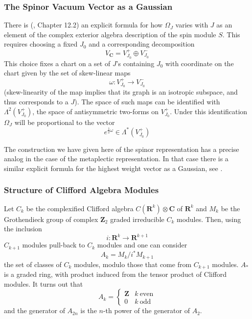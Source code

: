 \documentclass[a4paper,a4paper]{article}
\theoremstyle{conjecture}
\begin{document}
\subsubsection{The Spinor Vacuum Vector as a Gaussian}
\label{spinor-vacuum-vector}

There is (\cite{PS}, Chapter 12.2) an explicit formula for how $\Omega_J$ 
varies with $J$ as an element of the complex exterior algebra description of 
the spin module $S$. 
This requires choosing a fixed $J_0$ and a corresponding 
decomposition 
$$V_{\mathbf C}=V^+_{J_0}\oplus V^-_{J_0}$$
This choice fixes a chart on a set of $J$'s containing $J_0$ with coordinate
on the chart given by the set of skew-linear maps
$$\omega: V^+_{J_0}\rightarrow V^-_{J_0}$$
(skew-linearity of the map implies that its graph is an isotropic subspace,
and thus corresponds to a $J$). The space of such maps can be identified with
$\Lambda^2(V^+_{J_0})$, the space of antisymmetric two-forms on $V^+_{J_0}$. Under
this identification $\Omega_J$ will be proportional to the vector
$$e^{\frac{1}{2}\omega}\in \Lambda^*(V^+_{J_0})$$

The construction we have given here of the spinor representation has a precise
analog in the case of the metaplectic representation. In that case there is
a similar explicit formula for the highest weight vector as a Gaussian, see
\cite{Segal2}. 


\subsubsection{Structure of Clifford Algebra Modules}
\label{clifford-algebra-modules}


Let $C_k$ be the complexified Clifford algebra $C(\mathbf R^k)\otimes \mathbf C$ of
$\mathbf R^k$ and $M_k$ be the Grothendieck group of complex $\mathbf Z_2$ graded
irreducible $C_k$ modules. Then, using the inclusion
$$i:\mathbf R^k\rightarrow \mathbf R^{k+1}$$
$C_{k+1}$ modules pull-back to $C_k$ modules and one can consider
$$A_k=M_k/i^*M_{k+1}$$
the set of classes of $C_k$ modules, modulo those that come from $C_{k+1}$ modules.
$A_*$ is a graded ring, with product induced from the tensor product of Clifford
modules. It turns out \cite{ABS} that
\begin{equation*}
A_k=
\begin{cases}   
{\mathbf Z}&k\ \text{even}\\
0&k\ \text{odd}
\end{cases}
\end{equation*}
and the generator of $A_{2n}$ is the $n$-th power of the generator of $A_2$.
\end{document}
